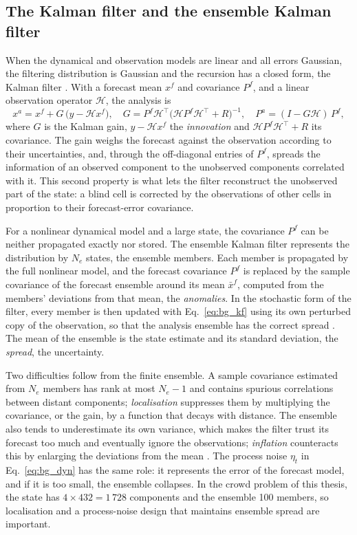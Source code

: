 \documentclass[english, 12pt, a4paper, elec, utf8, a-2b, online]{aaltothesis}
\begin{document}
\subsection{The Kalman filter and the ensemble Kalman filter}
\label{sec:bg_kalman}

When the dynamical and observation models are linear and all errors Gaussian,
the filtering distribution is Gaussian and the recursion has a closed form,
the Kalman filter \cite{roth2017enkf}. With a forecast mean $x^f$ and covariance
$P^f$, and a linear observation operator $\mathcal{H}$, the analysis is
\begin{equation}
	x^a = x^f + G\,\big(y - \mathcal{H} x^f\big), \quad
	G = P^f \mathcal{H}^{\top} \big(\mathcal{H} P^f \mathcal{H}^{\top} + R\big)^{-1}, \quad
	P^a = (I - G \mathcal{H})\, P^f,
	\label{eq:bg_kf}
\end{equation}
where $G$ is the Kalman gain, $y - \mathcal{H} x^f$ the \emph{innovation} and
$\mathcal{H} P^f \mathcal{H}^{\top} + R$ its covariance. The gain weighs the forecast against the
observation according to their uncertainties, and, through the off-diagonal
entries of $P^f$, spreads the information of an observed component to the
unobserved components correlated with it. This second property is what lets the
filter reconstruct the unobserved part of the state: a blind cell is corrected by
the observations of other cells in proportion to their forecast-error
covariance.

For a nonlinear dynamical model and a large state, the covariance $P^f$ can be
neither propagated exactly nor stored. The ensemble Kalman filter
\cite{roth2017enkf} represents the distribution by $N_e$ states, the
ensemble members. Each member is propagated by the full nonlinear model, and
the forecast covariance $P^f$ is replaced by the sample covariance of the
forecast ensemble around its mean $\bar{x}^f$, computed from the members'
deviations from that mean, the \emph{anomalies}. In the stochastic form of the filter, every
member is then updated with Eq.~\eqref{eq:bg_kf} using its own perturbed copy of
the observation, so that the analysis ensemble has the correct spread
\cite{burgers1998enkf, roth2017enkf}. The mean of the ensemble is the state estimate and its
standard deviation, the \emph{spread}, the uncertainty.

Two difficulties follow from the finite ensemble. A sample covariance estimated
from $N_e$ members has rank at most $N_e - 1$ and contains spurious correlations
between distant components; \emph{localisation} suppresses them by multiplying the
covariance, or the gain, by a function that decays with distance. The ensemble
also tends to underestimate its own variance, which makes the filter trust its
forecast too much and eventually ignore the observations; \emph{inflation}
counteracts this by enlarging the deviations from the mean
\cite{roth2017enkf}. The process noise $\eta_t$ in Eq.~\eqref{eq:bg_dyn}
has the same role: it represents the error of the forecast model, and if it is
too small, the ensemble collapses. In the crowd problem of this thesis, the state
has $4 \times 432 = 1\,728$ components and the ensemble 100 members, so
localisation and a process-noise design that maintains ensemble spread are
important.
\end{document}

